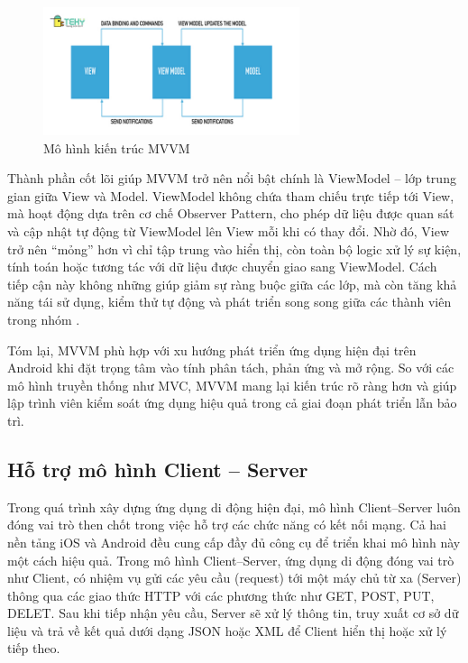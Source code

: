 \begin{figure}[H]
    \centering
    \includegraphics[width=0.67\textwidth]{images/mvvm.jpg}
    \caption{Mô hình kiến trúc MVVM \cite{tekyMVVM}}
    \label{fig:fig13}
  \end{figure}

    
      \hspace*{0.8cm}Thành phần cốt lõi giúp MVVM trở nên nổi bật chính là ViewModel – lớp trung gian giữa View và Model. ViewModel không chứa tham chiếu trực tiếp tới View, mà hoạt động dựa trên cơ chế Observer Pattern, cho phép dữ liệu được quan sát và cập nhật tự động từ ViewModel lên View mỗi khi có thay đổi. Nhờ đó, View trở nên “mỏng” hơn vì chỉ tập trung vào hiển thị, còn toàn bộ logic xử lý sự kiện, tính toán hoặc tương tác với dữ liệu được chuyển giao sang ViewModel. Cách tiếp cận này không những giúp giảm sự ràng buộc giữa các lớp, mà còn tăng khả năng tái sử dụng, kiểm thử tự động và phát triển song song giữa các thành viên trong nhóm \cite{testability_mvvm}.
    
      \vspace{0.5em}
    
        \hspace*{0.8cm}Tóm lại, MVVM phù hợp với xu hướng phát triển ứng dụng hiện đại trên Android khi đặt trọng tâm vào tính phân tách, phản ứng và mở rộng. So với các mô hình truyền thống như MVC, MVVM mang lại kiến trúc rõ ràng hơn và giúp lập trình viên kiểm soát ứng dụng hiệu quả trong cả giai đoạn phát triển lẫn bảo trì.
    

\subsection{Hỗ trợ mô hình Client – Server}
\renewcommand{\labelitemi}{--}    
    
        \hspace*{0.8cm}Trong quá trình xây dựng ứng dụng di động hiện đại, mô hình Client–Server luôn đóng vai trò then chốt trong việc hỗ trợ các chức năng có kết nối mạng. Cả hai nền tảng iOS và Android đều cung cấp đầy đủ công cụ để triển khai mô hình này một cách hiệu quả. Trong mô hình Client–Server, ứng dụng di động đóng vai trò như Client, có nhiệm vụ gửi các yêu cầu (request) tới một máy chủ từ xa (Server) thông qua các giao thức HTTP với các phương thức như GET, POST, PUT, DELET. Sau khi tiếp nhận yêu cầu, Server sẽ xử lý thông tin, truy xuất cơ sở dữ liệu và trả về kết quả dưới dạng JSON hoặc XML để Client hiển thị hoặc xử lý tiếp theo.
    

